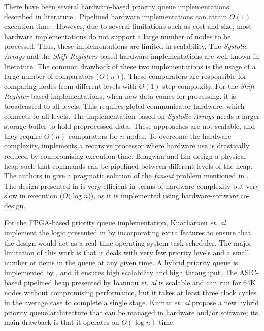 There have been several hardware-based priority queue implementations described in literature \cite{hw1,hw2,hw3,hw5,hw6,hw7,hw8,hw9}.
Pipelined hardware implementations can attain $O(1)$ execution time \cite{hw5,hw6}.
However, due to several limitations such as cost and size, most hardware implementations do not support a large number of nodes to be processed.
Thus, these implementations are limited in scalability.
The {\it Systolic Arrays} and the {\it Shift Registers} \cite{hw8,hw9} based hardware implementations are well known in literature.
The common drawback of these two implementations is the usage of a large number of comparators ($O(n)$).
These comparators are responsible for comparing nodes from different levels with $O(1)$ step complexity.
For the {\it Shift Register} \cite{hw9} based implementations, when new data comes for processing, it is broadcasted to all levels.
This requires global communicator hardware, which connects to all levels.
The implementation based on {\it Systolic Arrays} \cite{hw8} needs a larger storage buffer to hold preprocessed data.
These approaches are not scalable, and they require $O(n)$ comparators for $n$ nodes.
To overcome the hardware complexity, \cite{hw10} implements a recursive processor where hardware use is drastically reduced by compromising execution time.
Bhagwan and Lin \cite{hw2} design a physical heap such that commands can be pipelined between different levels of the heap.
The authors in \cite{hw1} give a pragmatic solution of the {\it fanout} problem mentioned in \cite{hw3}.
The design presented in \cite{hw11} is very efficient in terms of hardware complexity but very slow in execution ($O(\log n$)), as it is implemented using hardware-software co-design.

For the FPGA-based priority queue implementation, Kuacharoen {\it et. al} \cite{fpga3} implement the logic presented in \cite{hw3} by incorporating extra features to ensure that the design would act as a real-time operating system task scheduler.
The major limitation of this work is that it deals with very few priority levels and a small number of items in the queue at any given time.
A hybrid priority queue is implemented by \cite{fpga2}, and it ensures high scalability and high throughput.
The ASIC-based pipelined heap presented by Ioannou {\it et. al} \cite{fpga1} is scalable and can run for 64K nodes without compromising performance, but it takes at least three clock cycles in the average case to complete a single stage.
Kumar {\it et. al} \cite{hwsw1} propose a new hybrid priority queue architecture that can be managed in hardware and/or software; its main drawback is that it operates on $O(\log n)$ time.

